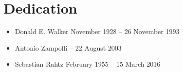 
\section[{Dedication}]{Dedication}\label{dedication}\par
{} \begin{itemize}
\item Donald E. Walker \mbox{} November 1928 – 26 November 1993
\item Antonio Zampolli \mbox{} – 22 August 2003
\item Sebastian Rahtz \mbox{} February 1955 – 15 March 2016
\end{itemize} 